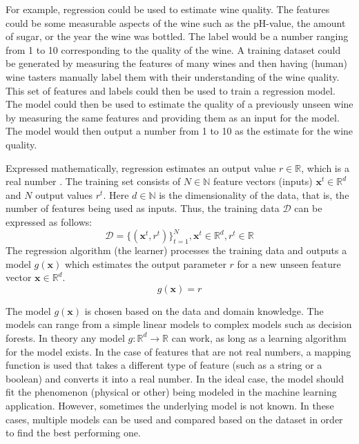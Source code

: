 For example, regression could be used to estimate wine quality.
The features could be some measurable aspects of the wine such as the pH-value, the amount of sugar, or the year the wine was bottled.
The label would be a number ranging from 1 to 10 corresponding to the quality of the wine.
A training dataset could be generated by measuring the features of many wines and then having (human) wine tasters manually label them with their understanding of the wine quality.
This set of features and labels could then be used to train a regression model.
The model could then be used to estimate the quality of a previously unseen wine by measuring the same features and providing them as an input for the model.
The model would then output a number from 1 to 10 as the estimate for the wine quality.

Expressed mathematically, regression estimates an output value $r \in \mathbb{R}$, which is a real number \cite{alpaydin}.
The training set consists of $N \in \mathbb{N}$ feature vectors (inputs) $\mathbf{x}^t \in \mathbb{R}^d$ and $N$ output values $r^t$.
Here $d \in \mathbb{N}$ is the dimensionality of the data, that is, the number of features being used as inputs. Thus, the training data $\mathcal{D}$ can be expressed as follows:
$$\mathcal{D} = \{(\mathbf{x}^t, r^t)\}_{t=1}^N, \mathbf{x}^t \in \mathbb{R}^d, r^t \in \mathbb{R}$$
The regression algorithm (the learner) processes the training data and outputs a model $g(\mathbf{x})$ which estimates the output parameter $r$ for a new unseen feature vector $\mathbf{x} \in \mathbb{R}^d$.
$$g(\mathbf{x}) = r$$

The model $g(\mathbf{x})$ is chosen based on the data and domain knowledge. 
The models can range from a simple linear models to complex models such as decision forests.
In theory any model $g: \mathbb{R}^d \rightarrow \mathbb{R}$ can work,
as long as a learning algorithm for the model exists.
In the case of features that are not real numbers, a mapping function is used that takes a different type of feature (such as a string or a boolean) and converts it into a real number.
In the ideal case, the model should fit the phenomenon (physical or other) being modeled in the machine learning application.
However, sometimes the underlying model is not known. 
In these cases, multiple models can be used and compared based on the dataset in order to find the best performing one.

